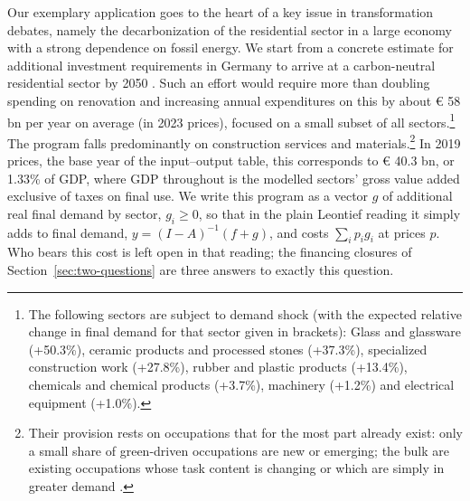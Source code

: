 Our exemplary application goes to the heart of a key issue in transformation debates, namely the decarbonization of the residential sector in a large economy with a strong dependence on fossil energy. We start from a concrete estimate for additional investment requirements in Germany to arrive at a carbon-neutral residential sector by 2050 \citep{Hornykewycz.2025}. Such an effort would require more than doubling spending on renovation and increasing annual expenditures on this by about € 58 bn per year on average (in 2023 prices), focused on a small subset of all sectors.\footnote{The following sectors are subject to demand shock (with the expected relative change in final demand for that sector given in brackets): Glass and glassware (+50.3\%), ceramic products and processed stones (+37.3\%), specialized construction work (+27.8\%), rubber and plastic products (+13.4\%), chemicals and chemical products (+3.7\%), machinery (+1.2\%) and electrical equipment (+1.0\%).} The program falls predominantly on construction services and materials.\footnote{Their provision rests on occupations that for the most part already exist: only a small share of green-driven occupations are new or emerging; the bulk are existing occupations whose task content is changing or which are simply in greater demand \citep{Bassanini.2024, Tyros.2023, Bachmann.2026, Wehden.2026}.} In 2019 prices, the base year of the input--output table, this corresponds to € 40.3 bn, or 1.33\% of GDP, where GDP throughout is the modelled sectors' gross value added exclusive of taxes on final use. We write this program as a vector $g$ of additional real final demand by sector, $g_i \geq 0$, so that in the plain Leontief reading it simply adds to final demand, $y = (I-A)^{-1}(f+g)$, and costs $\sum_i p_i g_i$ at prices $p$. Who bears this cost is left open in that reading; the financing closures of Section~\ref{sec:two-questions} are three answers to exactly this question.

